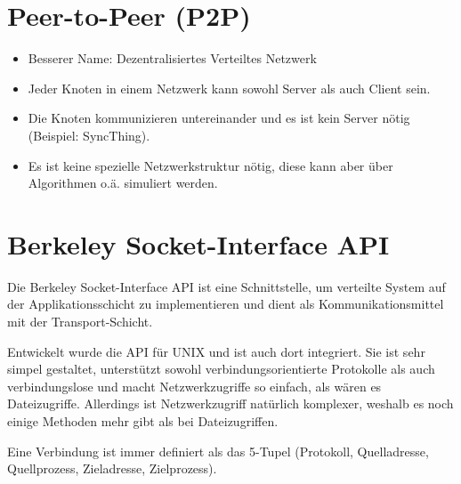     \section{Peer-to-Peer (P2P)}
        \begin{itemize}
        	\item Besserer Name: Dezentralisiertes Verteiltes Netzwerk
        	\item Jeder Knoten in einem Netzwerk kann sowohl Server als auch Client sein.
        	\item Die Knoten kommunizieren untereinander und es ist kein Server nötig (Beispiel: SyncThing).
        	\item Es ist keine spezielle Netzwerkstruktur nötig, diese kann aber über Algorithmen o.ä. simuliert werden.
        \end{itemize}

    \section{Berkeley Socket-Interface API}
        Die Berkeley Socket-Interface API ist eine Schnittstelle, um verteilte System auf der Applikationsschicht zu implementieren und dient als Kommunikationsmittel mit der Transport-Schicht.
        
        Entwickelt wurde die API für UNIX und ist auch dort integriert. Sie ist sehr simpel gestaltet, unterstützt sowohl verbindungsorientierte Protokolle als auch verbindungslose und macht Netzwerkzugriffe so einfach, als wären es Dateizugriffe. Allerdings ist Netzwerkzugriff natürlich komplexer, weshalb es noch einige Methoden mehr gibt als bei Dateizugriffen.
        
        Eine Verbindung ist immer definiert als das 5-Tupel (Protokoll, Quelladresse, Quellprozess, Zieladresse, Zielprozess).

